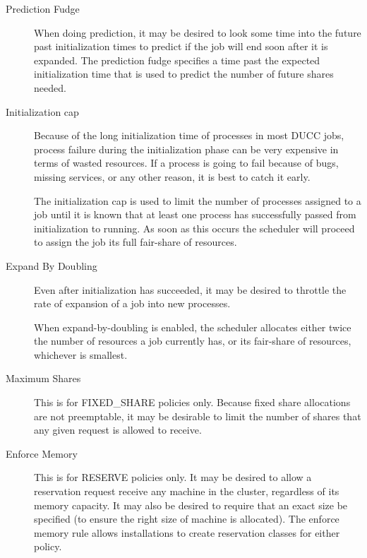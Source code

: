\begin{description}
        \item[Prediction Fudge] When doing prediction, it may be desired to look some time into the
          future past initialization times to predict if the job will end soon after it is expanded. The
          prediction fudge specifies a time past the expected initialization time that is used to
          predict the number of future shares needed.

        \item[Initialization cap] Because of the long initialization time of processes in most DUCC jobs,
          process failure during the initialization phase can be very expensive in terms of wasted
          resources. If a process is going to fail because of bugs, missing services, or any other
          reason, it is best to catch it early.

          The initialization cap is used to limit the number of processes assigned to a job until it is 
          known that at least one process has successfully passed from initialization to running. As soon 
          as this occurs the scheduler will proceed to assign the job its full fair-share of resources. 

        \item[Expand By Doubling] Even after initialization has succeeded, it may be desired to throttle
          the rate of expansion of a job into new processes.

          When expand-by-doubling is enabled, the scheduler allocates either twice the number of 
          resources a job currently has, or its fair-share of resources, whichever is smallest. 

        \item[Maximum Shares] This is for FIXED\_SHARE policies only. Because fixed share allocations are
          not preemptable, it may be desirable to limit the number of shares that any given request is
          allowed to receive.

        \item[Enforce Memory] This is for RESERVE policies only. It may be desired to allow a
          reservation request receive any machine in the cluster, regardless of its memory capacity. It
          may also be desired to require that an exact size be specified (to ensure the right size of
          machine is allocated). The enforce memory rule allows installations to create reservation
          classes for either policy.
    \end{description}
        
